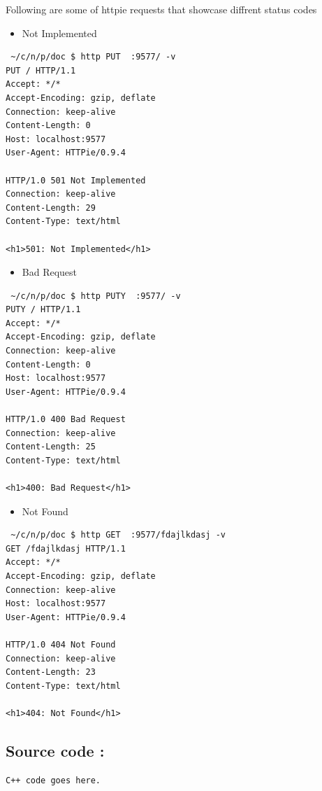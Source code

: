 \documentclass[11pt]{article}
\begin{document}
Following are some of httpie requests that showcase diffrent status codes
\begin{itemize}
\item Not Implemented
\end{itemize}
\begin{verbatim}
 ~/c/n/p/doc $ http PUT  :9577/ -v
PUT / HTTP/1.1
Accept: */*
Accept-Encoding: gzip, deflate
Connection: keep-alive
Content-Length: 0
Host: localhost:9577
User-Agent: HTTPie/0.9.4

HTTP/1.0 501 Not Implemented
Connection: keep-alive
Content-Length: 29
Content-Type: text/html

<h1>501: Not Implemented</h1>
\end{verbatim}
\begin{itemize}
\item Bad Request
\end{itemize}
\begin{verbatim}
 ~/c/n/p/doc $ http PUTY  :9577/ -v
PUTY / HTTP/1.1
Accept: */*
Accept-Encoding: gzip, deflate
Connection: keep-alive
Content-Length: 0
Host: localhost:9577
User-Agent: HTTPie/0.9.4

HTTP/1.0 400 Bad Request
Connection: keep-alive
Content-Length: 25
Content-Type: text/html

<h1>400: Bad Request</h1>
\end{verbatim}
\begin{itemize}
\item Not Found
\end{itemize}
\begin{verbatim}
 ~/c/n/p/doc $ http GET  :9577/fdajlkdasj -v
GET /fdajlkdasj HTTP/1.1
Accept: */*
Accept-Encoding: gzip, deflate
Connection: keep-alive
Host: localhost:9577
User-Agent: HTTPie/0.9.4

HTTP/1.0 404 Not Found
Connection: keep-alive
Content-Length: 23
Content-Type: text/html

<h1>404: Not Found</h1>
\end{verbatim}

\subsection{Source code :}
\label{sec:orgheadline25}
\begin{verbatim}
C++ code goes here.
\end{verbatim}
\end{document}
